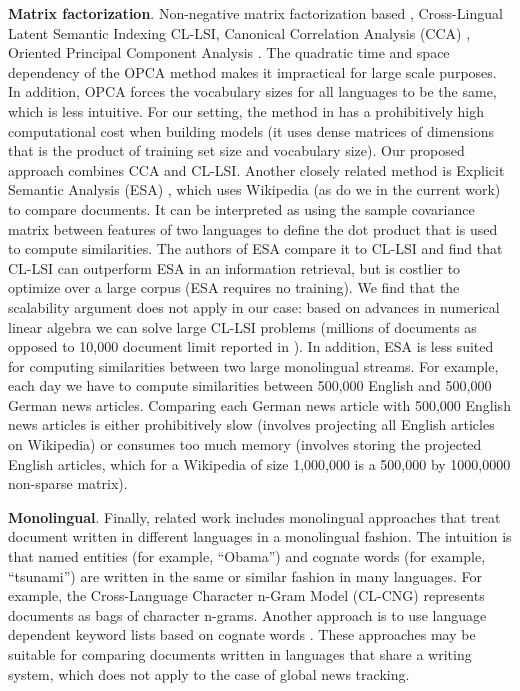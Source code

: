 \documentclass[twoside,11pt]{article}
\begin{document}
\textbf{Matrix factorization}. Non-negative matrix factorization based \cite{nonnegfactor_lsi}, Cross-Lingual Latent Semantic Indexing CL-LSI\cite{multilingualBook}, Canonical Correlation Analysis (CCA) \cite{Hotelling}, Oriented Principal Component Analysis \cite{platt2010translingual}. The quadratic time and space dependency of the OPCA method makes it impractical for large scale purposes. In addition, OPCA forces the vocabulary sizes for all languages to be the same, which is less intuitive. For our setting, the method in \cite{nonnegfactor_lsi} has a prohibitively high computational cost when building models (it uses dense matrices of dimensions that is the product of training set size and vocabulary size). Our proposed approach combines CCA and CL-LSI. Another closely related method is Explicit Semantic Analysis (ESA) \cite{ESA}, which uses Wikipedia (as do we in the current work) to compare documents. It can be interpreted as using the sample covariance matrix between features of two languages to define the dot product that is used to compute similarities. 
The authors of ESA compare it to CL-LSI and find that CL-LSI can outperform ESA in an information retrieval, but is costlier to optimize over a large corpus (ESA requires no training). We find that the scalability argument does not apply in our case: based on advances in numerical linear algebra we can solve large CL-LSI problems (millions of documents as opposed to 10,000 document limit reported in \cite{ESA}). In addition, ESA is less suited for computing similarities between two large monolingual streams. For example, each day we have to compute similarities between 500,000 English and 500,000 German news articles. Comparing each German news article with 500,000 English news articles is either prohibitively slow (involves projecting all English articles on Wikipedia) or consumes too much memory (involves storing the projected English articles, which for a Wikipedia of size 1,000,000 is a 500,000 by 1000,0000 non-sparse matrix).

\textbf{Monolingual}. Finally, related work includes monolingual approaches that treat document written in different languages in a monolingual fashion. The intuition is that named entities (for example, ``Obama'') and cognate words (for example, ``tsunami'') are written in the same or similar fashion in many languages. For example, the Cross-Language Character n-Gram Model (CL-CNG) \cite{plagiarism} represents documents as bags of character n-grams. Another approach is to use language dependent keyword lists based on cognate words \cite{pouliquen2008story}. These approaches may be suitable for comparing documents written in languages that share a writing system, which does not apply to the case of global news tracking.
\end{document}
